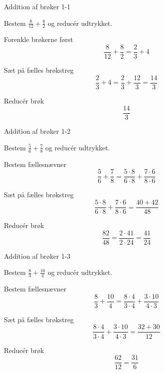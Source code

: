 \documentclass{article}
\begin{document}

\tableofcontents
\newpage

\begin{exercise}{Addition af brøker 1-1}

Bestem $\frac{8}{12} + \frac{8}{2}$ og reducér udtrykket.


\hint

Forenkle brøkerne først
\[
\frac{8}{12} + \frac{8}{2} = \frac{2}{3} + 4
\]

\hint

Sæt på fælles brøkstreg
\[
\frac{2}{3} + 4 = \frac{2}{3} + \frac{12}{3} = \frac{14}{3}
\]

\hint

Reducér brøk
\[
\frac{14}{3}
\]

\end{exercise}

\newpage

\begin{exercise}{Addition af brøker 1-2}

Bestem $\frac{5}{6} + \frac{7}{8}$ og reducér udtrykket.


\hint

Bestem fællesnævner
\[
\frac{5}{6} + \frac{7}{8} = \frac{5 \cdot 8 }{6 \cdot 8} + \frac{7 \cdot 6}{8\cdot 6}
\]

\hint

Sæt på fælles brøkstreg
\[
\frac{5 \cdot 8 }{6 \cdot 8} + \frac{7 \cdot 6}{8\cdot 6} = \frac{40 + 42}{48}
\]

\hint

Reducér brøk
\[
\frac{82}{48} = \frac{2 \cdot 41}{2 \cdot 24} = \frac{41}{24}
\]

\end{exercise}

\newpage

\begin{exercise}{Addition af brøker 1-3}

Bestem $\frac{8}{3} + \frac{10}{4}$ og reducér udtrykket.


\hint

Bestem fællesnævner
\[
\frac{8}{3} + \frac{10}{4} = \frac{8 \cdot 4 }{3 \cdot 4} + \frac{3 \cdot 10}{4\cdot 3}
\]

\hint

Sæt på fælles brøkstreg
\[
\frac{8 \cdot 4 }{3 \cdot 4} + \frac{3 \cdot 10}{4\cdot 3} = \frac{32 + 30}{12}
\]

\hint

Reducér brøk
\[
\frac{62}{12} = \frac{31}{6}
\]

\end{exercise}
\end{document}
